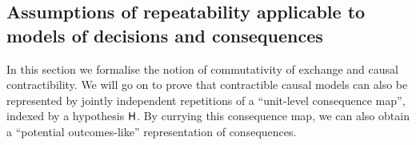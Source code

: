 









\subsection{Assumptions of repeatability applicable to models of decisions and consequences}

In this section we formalise the notion of commutativity of exchange and causal contractibility. We will go on to prove that contractible causal models can also be represented by jointly independent repetitions of a ``unit-level consequence map'', indexed by a hypothesis $\mathsf{H}$. By currying this consequence map, we can also obtain a ``potential outcomes-like'' representation of consequences.

